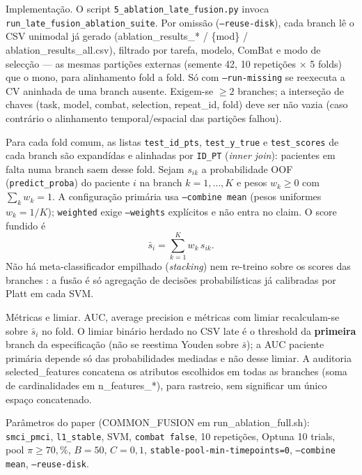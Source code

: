 \documentclass[review]{elsarticle}
\newcommand{\code}[1]{\texttt{#1}}
\begin{document}
Implementação. O script \code{5\_ablation\_late\_fusion.py} invoca \code{run\_late\_fusion\_ablation\_suite}. Por omissão (\code{--reuse-disk}), cada branch lê o CSV unimodal já gerado (ablation\_results\_* / \{mod\} / ablation\_results\_all.csv), filtrado por tarefa, modelo, ComBat e modo de selecção — as mesmas partições externas (semente 42, 10 repetições × 5 folds) que o mono, para alinhamento fold a fold. Só com \code{--run-missing} se reexecuta a CV aninhada de uma branch ausente. Exigem-se $\geq 2$ branches; a interseção de chaves (task, model, combat, selection, repeat\_id, fold) deve ser não vazia (caso contrário o alinhamento temporal/espacial das partições falhou).

Para cada fold comum, as listas \texttt{test\_id\_pts}, \texttt{test\_y\_true}
e \texttt{test\_scores} de cada branch são expandídas e alinhadas por
\texttt{ID\_PT} (\emph{inner join}): pacientes em falta numa branch saem
desse fold. Sejam $s_{ik}$ a probabilidade OOF
(\texttt{predict\_proba}) do paciente $i$ na branch $k=1,\ldots,K$
e pesos $w_k\geq 0$ com $\sum_k w_k=1$. A configuração primária usa
\code{--combine mean} (pesos uniformes $w_k=1/K$); \code{weighted}
exige \code{--weights} explícitos e não entra no claim. O score fundido é
\begin{equation}
\bar{s}_i = \sum_{k=1}^{K} w_k\, s_{ik}.
\label{eq:late-mean}
\end{equation}
Não há meta-classificador empilhado (\emph{stacking}) nem re-treino sobre
os scores das branches \cite{wolpert-1992}: a fusão é só agregação de
decisões probabilísticas já calibradas por Platt em cada SVM.

Métricas e limiar. AUC, average precision e métricas com limiar recalculam-se sobre ${\bar{s}_i}$ no fold. O limiar binário herdado no CSV late é o threshold da \textbf{primeira} branch da especificação (não se reestima Youden sobre $\bar{s}$); a AUC paciente primária depende só das probabilidades mediadas e não desse limiar. A auditoria selected\_features concatena os atributos escolhidos em todas as branches (soma de cardinalidades em n\_features\_*), para rastreio, sem significar um único espaço concatenado.

Parâmetros do paper (COMMON\_FUSION em run\_ablation\_full.sh): \code{smci\_pmci}, \code{l1\_stable}, SVM, \code{combat false}, 10 repetições, Optuna 10 trials, pool $\pi\geq 70,\%$, $B=50$, $C=0{,}1$, \code{stable-pool-min-timepoints=0}, \code{--combine mean}, \code{--reuse-disk}.
\end{document}
